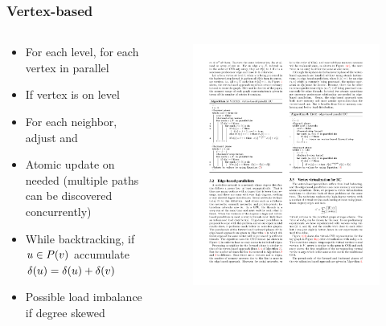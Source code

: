 \begin{frame}
  \frametitle{Vertex-based}

  \begin{columns}[onlytextwidth]
    \begin{column}{0.5\textwidth}
      \begin{itemize}
        \item For each level, for each vertex in parallel
        \item If vertex is on level
        \item For each neighbor, adjust \pred and \paths
        \item Atomic update on \paths needed (multiple paths can be discovered concurrently)
        \item While backtracking, if $u \in P(v)$ accumulate $\delta(u) = \delta(u) + \delta(v)$
        \item Possible load imbalance if degree skewed
      \end{itemize}
    \end{column}

    \begin{column}{0.5\textwidth}
      \begin{figure}[t]
        \centering
        \includegraphics[width=\textwidth, height=0.8\textheight, keepaspectratio]{imgs/gpu-algo-vertex}
      \end{figure}
    \end{column}
  \end{columns}

\end{frame}


